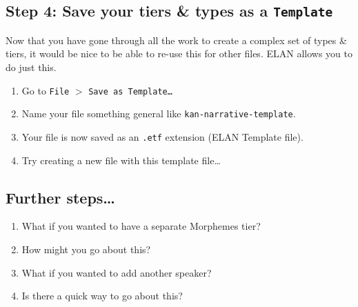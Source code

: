 \documentclass[letterpaper,12pt]{article}
\begin{document}
\subsection*{Step 4: Save your tiers \& types as a \texttt{Template}}
Now that you have gone through all the work to create a complex set of types \& tiers, it would be nice to be able to re-use this for other files. ELAN allows you to do just this.
  \begin{enumerate}
    \item Go to \texttt{File} $>$ \texttt{Save as Template\ldots}
    \item Name your file something general like \texttt{kan-narrative-template}.
    \item Your file is now saved as an \texttt{.etf} extension (ELAN Template file).
    \item Try creating a new file with this template file\ldots
  \end{enumerate}  

\subsection*{Further steps\ldots}
\begin{enumerate}
\item What if you wanted to have a separate Morphemes tier?
\item How might you go about this? 
\item What if you wanted to add another speaker? 
\item Is there a quick way to go about this?
\end{enumerate}

\end{document}
